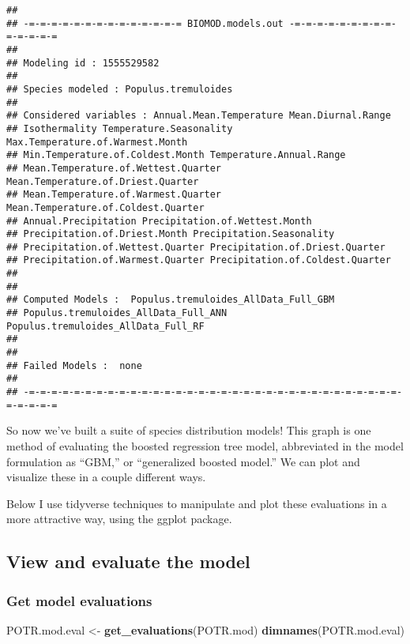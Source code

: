 \documentclass[]{article}
\newenvironment{Shaded}{\begin{snugshade}}{\end{snugshade}}
\newcommand{\KeywordTok}[1]{\textcolor[rgb]{0.13,0.29,0.53}{\textbf{#1}}}
\newcommand{\StringTok}[1]{\textcolor[rgb]{0.31,0.60,0.02}{#1}}
\newcommand{\NormalTok}[1]{#1}
\begin{document}
\begin{verbatim}
## 
## -=-=-=-=-=-=-=-=-=-=-=-=-=-= BIOMOD.models.out -=-=-=-=-=-=-=-=-=-=-=-=-=-=
## 
## Modeling id : 1555529582
## 
## Species modeled : Populus.tremuloides
## 
## Considered variables : Annual.Mean.Temperature Mean.Diurnal.Range 
## Isothermality Temperature.Seasonality Max.Temperature.of.Warmest.Month 
## Min.Temperature.of.Coldest.Month Temperature.Annual.Range 
## Mean.Temperature.of.Wettest.Quarter Mean.Temperature.of.Driest.Quarter 
## Mean.Temperature.of.Warmest.Quarter Mean.Temperature.of.Coldest.Quarter 
## Annual.Precipitation Precipitation.of.Wettest.Month 
## Precipitation.of.Driest.Month Precipitation.Seasonality 
## Precipitation.of.Wettest.Quarter Precipitation.of.Driest.Quarter 
## Precipitation.of.Warmest.Quarter Precipitation.of.Coldest.Quarter
## 
## 
## Computed Models :  Populus.tremuloides_AllData_Full_GBM 
## Populus.tremuloides_AllData_Full_ANN Populus.tremuloides_AllData_Full_RF
## 
## 
## Failed Models :  none
## 
## -=-=-=-=-=-=-=-=-=-=-=-=-=-=-=-=-=-=-=-=-=-=-=-=-=-=-=-=-=-=-=-=-=-=-=-=-=-=
\end{verbatim}

So now we've built a suite of species distribution models! This graph is
one method of evaluating the boosted regression tree model, abbreviated
in the model formulation as ``GBM,'' or ``generalized boosted model.''
We can plot and visualize these in a couple different ways.

Below I use tidyverse techniques to manipulate and plot these
evaluations in a more attractive way, using the ggplot package.

\subsection{View and evaluate the
model}\label{view-and-evaluate-the-model}

\subsubsection{Get model evaluations}\label{get-model-evaluations}

\begin{Shaded}
\begin{Highlighting}[]
\NormalTok{POTR.mod.eval <-}\StringTok{ }\KeywordTok{get_evaluations}\NormalTok{(POTR.mod)}
    \KeywordTok{dimnames}\NormalTok{(POTR.mod.eval)}
\end{Highlighting}
\end{Shaded}
\end{document}
